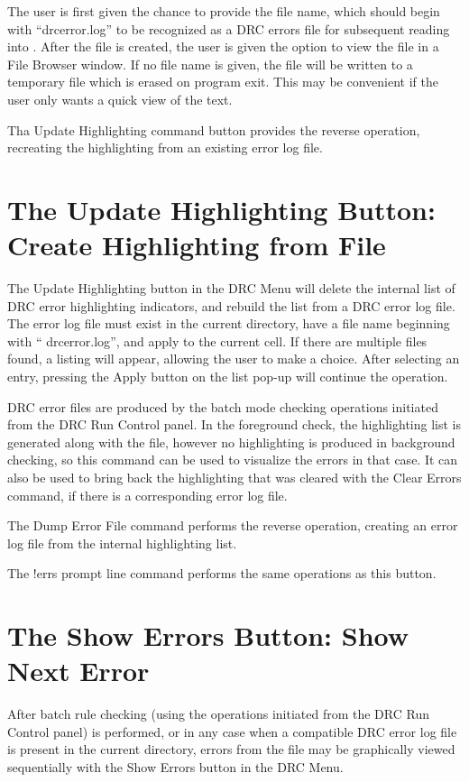 The user is first given the chance to provide the file name, which
should begin with ``{\vt drcerror.log}'' to be recognized as a DRC
errors file for subsequent reading into {\Xic}.  After the file is
created, the user is given the option to view the file in a {\cb File
Browser} window.  If no file name is given, the file will be written
to a temporary file which is erased on program exit.  This may be
convenient if the user only wants a quick view of the text.

Tha {\cb Update Highlighting} command button provides the reverse
operation, recreating the highlighting from an existing error log
file.


\section{The {\cb Update Highlighting} Button: Create Highlighting from File}
The {\cb Update Highlighting} button in the {\cb DRC Menu} will delete
the internal list of DRC error highlighting indicators, and rebuild
the list from a DRC error log file.  The error log file must exist in
the current directory, have a file name beginning with ``{\vt
drcerror.log}'', and apply to the current cell.  If there are multiple
files found, a listing will appear, allowing the user to make a
choice.  After selecting an entry, pressing the {\cb Apply} button on
the list pop-up will continue the operation.

DRC error files are produced by the batch mode checking operations
initiated from the {\cb DRC Run Control} panel.  In the foreground
check, the highlighting list is generated along with the file, however
no highlighting is produced in background checking, so this command
can be used to visualize the errors in that case.  It can also be used
to bring back the highlighting that was cleared with the {\cb Clear
Errors} command, if there is a corresponding error log file.

The {\cb Dump Error File} command performs the reverse operation,
creating an error log file from the internal highlighting list.

The {\cb !errs} prompt line command performs the same operations as
this button.


\section{The {\cb Show Errors} Button: Show Next Error}
After batch rule checking (using the operations initiated from the
{\cb DRC Run Control} panel) is performed, or in any case when a
compatible DRC error log file is present in the current directory,
errors from the file may be graphically viewed sequentially with the
{\cb Show Errors} button in the {\cb DRC Menu}. 

